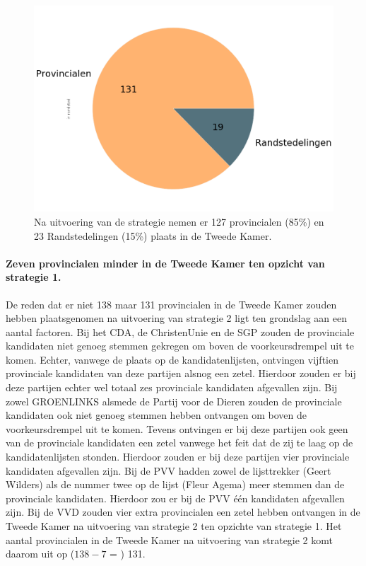 \begin{figure}[H]
\centering
	\includegraphics[width=0.45\linewidth]{pie_chart_willekeurig_provincialen1.png}

			\caption{Na uitvoering van de strategie nemen er 127 provincialen (85\%) en 23 Randstedelingen (15\%) plaats in de Tweede Kamer.}

\label{fig:pcS2P}
\end{figure}





\paragraph{Zeven provincialen minder in de Tweede Kamer ten opzicht van strategie 1.}
De reden dat er niet 138 maar 131 provincialen in de Tweede Kamer zouden hebben plaatsgenomen na uitvoering van strategie 2 ligt ten grondslag aan een aantal factoren. Bij het CDA, de ChristenUnie en de SGP zouden de provinciale kandidaten niet genoeg stemmen gekregen om boven de voorkeursdrempel uit te komen. Echter, vanwege de plaats op de kandidatenlijsten, ontvingen vijftien provinciale kandidaten van deze partijen alsnog een zetel. Hierdoor zouden er bij deze partijen echter wel totaal zes provinciale kandidaten afgevallen zijn. Bij zowel GROENLINKS alsmede de Partij voor de Dieren zouden de provinciale kandidaten ook niet genoeg stemmen hebben ontvangen om boven de voorkeursdrempel uit te komen. Tevens ontvingen er bij deze partijen ook geen van de provinciale kandidaten een zetel vanwege het feit dat de zij te laag op de kandidatenlijsten stonden. Hierdoor zouden er bij deze partijen vier provinciale kandidaten afgevallen zijn. Bij de PVV hadden zowel de lijsttrekker (Geert Wilders) als de nummer twee op de lijst (Fleur Agema) meer stemmen dan de provinciale kandidaten. Hierdoor zou er bij de PVV één kandidaten afgevallen zijn. Bij de VVD zouden vier extra provincialen een zetel hebben ontvangen in de Tweede Kamer na uitvoering van strategie 2 ten opzichte van strategie 1. Het aantal provincialen in de Tweede Kamer na uitvoering van strategie 2 komt daarom uit op ($138-7$ = ) 131.



